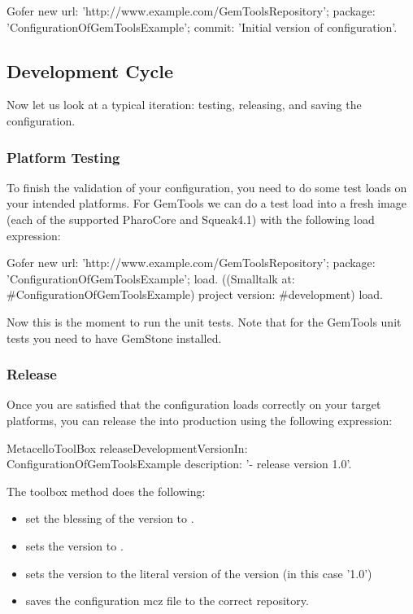 \documentclass[a4paper,10pt,twoside]{book}
\begin{document}
\begin{code}{}
  Gofer new
    url: 'http://www.example.com/GemToolsRepository';
    package: 'ConfigurationOfGemToolsExample';
    commit: 'Initial version of configuration'.
\end{code}    


\subsection{Development Cycle}
Now let us look at a typical iteration: testing, releasing, and saving the configuration.
 
\subsubsection{Platform Testing}
To finish the validation of your configuration, you need to do some test loads on your intended platforms. For GemTools we can do a test load into a fresh image (each of the supported PharoCore and Squeak4.1) with the following load expression:

\begin{code}{}
Gofer new
  url: 'http://www.example.com/GemToolsRepository';
  package: 'ConfigurationOfGemToolsExample';
  load.
((Smalltalk at: #ConfigurationOfGemToolsExample)
    project version: #development) load.
\end{code}    
    
Now this is the moment to run the unit tests. Note that for the GemTools unit tests you need to have GemStone installed.

\subsubsection{Release}
Once you are satisfied that the configuration loads correctly on your target platforms, you can release the  into production using the following expression:

\begin{code}{}
  MetacelloToolBox
    releaseDevelopmentVersionIn: ConfigurationOfGemToolsExample
    description: '- release version 1.0'.
\end{code}    

The toolbox method  does the following:
\begin{itemize}
\item set the blessing of the  version to .
\item sets the  version to .
\item sets the  version to the literal version of the  version (in this case '1.0')
\item saves the configuration mcz file to the correct repository.
\end{itemize}
\end{document}
